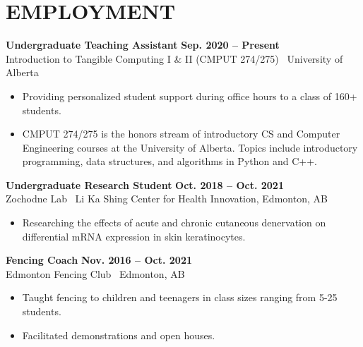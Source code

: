 \documentclass{article}
\begin{document}
\section*{\textcolor{my_colour}{EMPLOYMENT}}
\vspace{-.25em} \hrulefill \vspace{.75em}

    \textbf{Undergraduate Teaching Assistant} \hfill \textbf{Sep. 2020 -- Present}\\
    Introduction to Tangible Computing I \& II (CMPUT 274/275) \textbar\ University of Alberta
    \begin{itemize}
        \item Providing personalized student support during office hours to a class of 160+ students.
        \item CMPUT 274/275 is the honors stream of introductory CS and Computer Engineering courses at the University of Alberta. Topics include introductory programming, data structures, and algorithms in Python and C++.
    \end{itemize}

    \textbf{Undergraduate Research Student} \hfill \textbf{Oct. 2018 -- Oct. 2021}\\
    Zochodne Lab \textbar\ Li Ka Shing Center for Health Innovation, Edmonton, AB
    \begin{itemize}
        \item Researching the effects of acute and chronic cutaneous denervation on differential mRNA expression in skin keratinocytes.
    \end{itemize}

    \textbf{Fencing Coach} \hfill \textbf{Nov. 2016 -- Oct. 2021}\\
    Edmonton Fencing Club \textbar\ Edmonton, AB
    \begin{itemize}
        \item Taught fencing to children and teenagers in class sizes ranging from 5-25 students.
        \item Facilitated demonstrations and open houses.
    \end{itemize}


\end{document}
